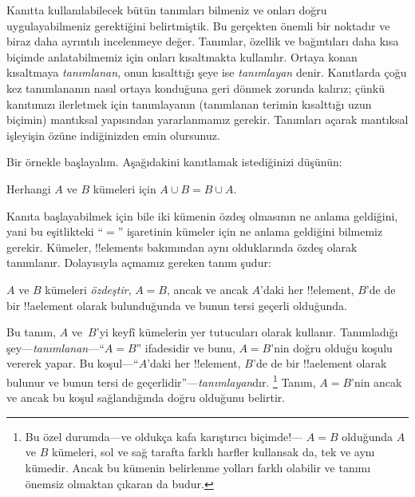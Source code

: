 



Kanıtta kullanılabilecek bütün tanımları bilmeniz ve onları doğru
uygulayabilmeniz gerektiğini belirtmiştik. Bu gerçekten önemli bir
noktadır ve biraz daha ayrıntılı incelenmeye değer. Tanımlar, özellik
ve bağıntıları daha kısa biçimde anlatabilmemiz için onları
kısaltmakta kullanılır. Ortaya konan kısaltmaya \emph{tanımlanan}, onun
kısalttığı şeye ise \emph{tanımlayan} denir. Kanıtlarda çoğu kez
tanımlananın nasıl ortaya konduğuna geri dönmek zorunda kalırız; çünkü
kanıtımızı ilerletmek için tanımlayanın (tanımlanan terimin kısalttığı
uzun biçimin) mantıksal yapısından yararlanmamız gerekir. Tanımları
açarak mantıksal işleyişin özüne indiğinizden emin olursunuz.

Bir örnekle başlayalım. Aşağıdakini kanıtlamak istediğinizi düşünün:

\begin{prop}
Herhangi $A$ ve $B$ kümeleri için $A \cup B = B \cup A$.
\end{prop}

Kanıta başlayabilmek için bile iki kümenin özdeş olmasının ne anlama
geldiğini, yani bu eşitlikteki ``$=$'' işaretinin kümeler için ne
anlama geldiğini bilmemiz gerekir. Kümeler, !!{element}s bakımından aynı
olduklarında özdeş olarak tanımlanır. Dolayısıyla açmamız gereken tanım
şudur:

\begin{defn}
$A$ ve $B$ kümeleri
\emph{özdeştir}, $A = B$, ancak ve ancak $A$'daki her !!{element},
$B$'de de bir !!a{element} olarak bulunduğunda ve bunun tersi geçerli
olduğunda.
\end{defn}

Bu tanım, $A$ ve~$B$'yi keyfî kümelerin yer tutucuları olarak kullanır.
Tanımladığı şey---\emph{tanımlanan}---``$A = B$'' ifadesidir ve bunu,
$A = B$'nin doğru olduğu koşulu vererek yapar. Bu koşul---``$A$'daki her
!!{element}, $B$'de de bir !!a{element} olarak bulunur ve bunun tersi de
geçerlidir''---\emph{tanımlayan}dır.
\footnote{Bu özel durumda---ve oldukça kafa karıştırıcı biçimde!---
  $A = B$ olduğunda $A$ ve $B$ kümeleri, sol ve sağ tarafta farklı
  harfler kullansak da, tek ve aynı kümedir. Ancak bu kümenin
  belirlenme yolları farklı olabilir ve tanımı önemsiz olmaktan
  çıkaran da budur.} Tanım, $A = B$'nin ancak ve ancak bu koşul
sağlandığında doğru olduğunu belirtir.

